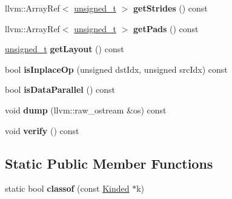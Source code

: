 \begin{DoxyCompactItemize}
\item 
\mbox{\label{classglow_1_1_avg_pool_grad_inst_a840ba0be51726fa4cfb54ff88efc77b4}} 
llvm\+::\+Array\+Ref$<$ \hyperlink{namespaceglow_a0ca574644e1e42ef193a9947fb4d8911}{unsigned\+\_\+t} $>$ {\bfseries get\+Strides} () const
\item 
\mbox{\label{classglow_1_1_avg_pool_grad_inst_ad059f944e78e13d9a770db4b986dd2fb}} 
llvm\+::\+Array\+Ref$<$ \hyperlink{namespaceglow_a0ca574644e1e42ef193a9947fb4d8911}{unsigned\+\_\+t} $>$ {\bfseries get\+Pads} () const
\item 
\mbox{\label{classglow_1_1_avg_pool_grad_inst_abcb6967424bad0d383da7c53340664b3}} 
\hyperlink{namespaceglow_a0ca574644e1e42ef193a9947fb4d8911}{unsigned\+\_\+t} {\bfseries get\+Layout} () const
\item 
\mbox{\label{classglow_1_1_avg_pool_grad_inst_acb05a7aaba4543540b58dbe2dd7ec447}} 
bool {\bfseries is\+Inplace\+Op} (unsigned dst\+Idx, unsigned src\+Idx) const
\item 
\mbox{\label{classglow_1_1_avg_pool_grad_inst_aedb9be2684c9d1bc624712074e025b6d}} 
bool {\bfseries is\+Data\+Parallel} () const
\item 
\mbox{\label{classglow_1_1_avg_pool_grad_inst_ae0f9634f654ebb6314af1d787e925a96}} 
void {\bfseries dump} (llvm\+::raw\+\_\+ostream \&os) const
\item 
\mbox{\label{classglow_1_1_avg_pool_grad_inst_a9ae37d77c39592bb93b6c440cfce4ab1}} 
void {\bfseries verify} () const
\end{DoxyCompactItemize}
\subsection*{Static Public Member Functions}
\begin{DoxyCompactItemize}
\item 
\mbox{\label{classglow_1_1_avg_pool_grad_inst_a23c065853815af1ab0c32d7f7c06529f}} 
static bool {\bfseries classof} (const \hyperlink{classglow_1_1_kinded}{Kinded} $\ast$k)
\end{DoxyCompactItemize}
